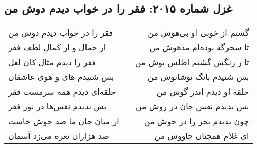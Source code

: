 \begin{center}
\section*{غزل شماره ۲۰۱۵: فقر را در خواب دیدم دوش من}
\label{sec:2015}
\begin{longtable}{l p{0.5cm} r}
فقر را در خواب دیدم دوش من
&&
گشتم از خوبی او بی‌هوش من
\\
از جمال و از کمال لطف فقر
&&
تا سحرگه بوده‌ام مدهوش من
\\
فقر را دیدم مثال کان لعل
&&
تا ز رنگش گشتم اطلس پوش من
\\
بس شنیدم های و هوی عاشقان
&&
بس شنیدم بانگ نوشانوش من
\\
حلقه‌ای دیدم همه سرمست فقر
&&
حلقه او دیدم اندر گوش من
\\
بس بدیدم نقش‌ها در نور فقر
&&
بس بدیدم نقش جان در روش من
\\
از میان جان ما صد جوش خاست
&&
چون بدیدم بحر را در جوش من
\\
صد هزاران نعره می‌زد آسمان
&&
ای غلام همچنان چاووش من
\\
\end{longtable}
\end{center}
